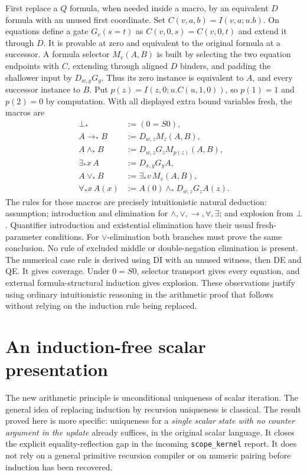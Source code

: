 \documentclass[11pt]{article}
\theoremstyle{definition}\newtheorem{definition}[theorem]{Definition}
\begin{document}
First replace a $Q$ formula, when needed inside a macro, by an equivalent
$D$ formula with an unused first coordinate.  Set
$C(v,a,b)=I(v,a;u.b)$.  On equations define a gate
$G_v(s=t)$ as $C(v,0,s)=C(v,0,t)$ and extend it through $D$.
It is provable at zero and equivalent to the original formula at a
successor.  A formula selector $M_v(A,B)$ is built by selecting the two
equation endpoints with $C$, extending through aligned $D$ binders,
and padding the shallower input by $D_{w,y}G_y$.  Thus its zero instance
is equivalent to $A$, and every successor instance to $B$.
Put $p(z)=I(z,0;u.C(u,1,0))$, so $p(1)=1$ and $p(2)=0$ by computation.
With all displayed extra bound variables fresh, the macros are
\begin{align*}
 \bot_*&:=(0=S0),\\
 A\to_*B&:=D_{w,z}M_z(A,B),\\
 A\land_*B&:=D_{w,z}G_zM_{p(z)}(A,B),\\
 \exists_*x\,A&:=D_{x,y}G_yA,\\
 A\lor_*B&:=\exists_*v\,M_v(A,B),\\
 \forall_*x\,A(x)&:=A(0)\land_*D_{w,z}G_zA(z).
\end{align*}
The rules for these macros are precisely intuitionistic natural deduction:
assumption; introduction and elimination for $\land,\lor,\to,\forall,
\exists$; and explosion from $\bot$.  Quantifier introduction and
existential elimination have their usual fresh-parameter conditions.
For $\lor$-elimination both branches must prove the same conclusion.
No rule of excluded middle or double-negation elimination is present.
The numerical case rule is derived using DI with an unused witness,
then DE and QE.  It gives coverage.  Under $0=S0$, selector transport
gives every equation, and external formula-structural induction gives
explosion.  These observations justify using ordinary intuitionistic
reasoning in the arithmetic proof that follows without relying on the
induction rule being replaced.



\section{An induction-free scalar presentation}
\label{sec:ur-main}

The new arithmetic principle is unconditional uniqueness of scalar
iteration.  The general idea of replacing induction by recursion
uniqueness is classical.  The result proved here is more specific:
uniqueness for a \emph{single scalar state with no counter argument in
the update} already suffices, in the original scalar language.  It
closes the explicit equality-reflection gap in the incoming
\texttt{scope\_kernel} report.  It does not rely on a general primitive
recursion compiler or on numeric pairing before induction has been
recovered.
\end{document}
